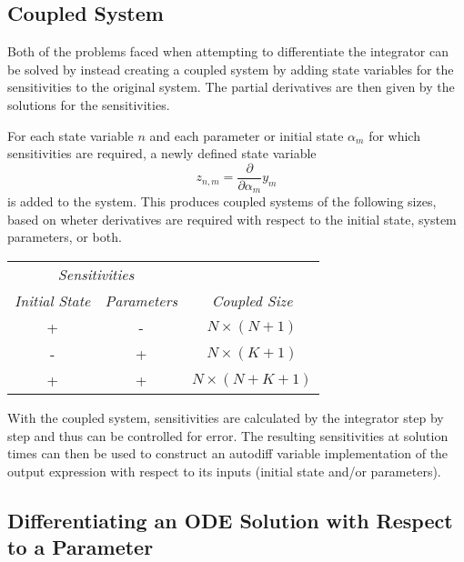\documentclass[10pt]{article}
\begin{document}
\subsection{Coupled System}

Both of the problems faced when attempting to differentiate the
integrator can be solved by instead creating a coupled system by
adding state variables for the sensitivities to the original system.
The partial derivatives are then given by the solutions for the
sensitivities.  

For each state variable $n$ and each parameter or initial state
$\alpha_m$ for which sensitivities are required, a newly defined state
variable
\[
z_{n,m} = \frac{\partial}{\partial \alpha_m} y_m
\]
is added to the system.  This produces coupled systems of the
following sizes, based on wheter derivatives are required with respect
to the initial state, system parameters, or both.
%
\begin{center}
\begin{tabular}{cc|c}
\multicolumn{2}{c|}{\it Sensitivities} &
\\
{\it Initial State} & {\it Parameters} & {\it Coupled Size}
\\ \hline
+ & - & $N \times (N + 1)$
\\
- & + & $N \times (K + 1)$ 
\\
+ & + & $N \times (N + K + 1)$
\end{tabular}
\end{center} 

With the coupled system, sensitivities are calculated by the
integrator step by step and thus can be controlled for error.  The
resulting sensitivities at solution times can then be used to
construct an autodiff variable implementation of the output expression
with respect to its inputs (initial state and/or parameters).


\subsection{Differentiating an ODE Solution with Respect to a Parameter}
\end{document}
